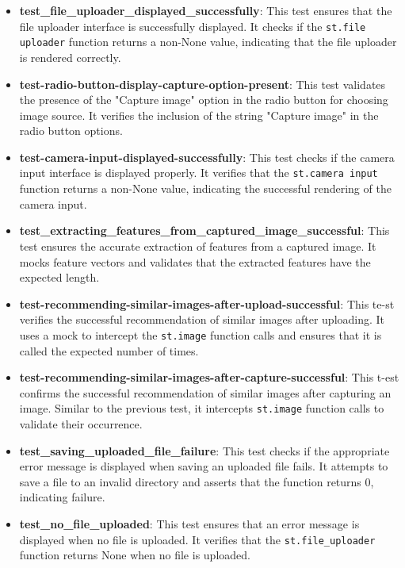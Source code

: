 \begin{itemize}
    \item \textbf{test\_file\_uploader\_displayed\_successfully}: This test ensures that the file uploader interface is successfully displayed. It checks if the \texttt{st.file uploader} function returns a non-None value, indicating that the file uploader is rendered correctly.
        
    \item \textbf{test-radio-button-display-capture-option-present}: This test validates the presence of the "Capture image" option in the radio button for choosing image source. It verifies the inclusion of the string "Capture image" in the radio button options.
        
    \item \textbf{test-camera-input-displayed-successfully}: This test checks if the camera input interface is displayed properly. It verifies that the \texttt{st.camera input} function returns a non-None value, indicating the successful rendering of the camera input.
    
    \item \textbf{test\_extracting\_features\_from\_captured\_image\_successful}: This test ensures the accurate extraction of features from a captured image. It mocks feature vectors and validates that the extracted features have the expected length.
        
    \item \textbf{test-recommending-similar-images-after-upload-successful}: This te-st verifies the successful recommendation of similar images after uploading. It uses a mock to intercept the \texttt{st.image} function calls and ensures that it is called the expected number of times.
        
    \item \textbf{test-recommending-similar-images-after-capture-successful}: This t-est confirms the successful recommendation of similar images after capturing an image. Similar to the previous test, it intercepts \texttt{st.image} function calls to validate their occurrence.
    
    
    \item \textbf{test\_saving\_uploaded\_file\_failure}: This test checks if the appropriate error message is displayed when saving an uploaded file fails. It attempts to save a file to an invalid directory and asserts that the function returns 0, indicating failure.
        
    \item \textbf{test\_no\_file\_uploaded}: This test ensures that an error message is displayed when no file is uploaded. It verifies that the \texttt{st.file\_uploader} function returns None when no file is uploaded.
        

\end{itemize}
